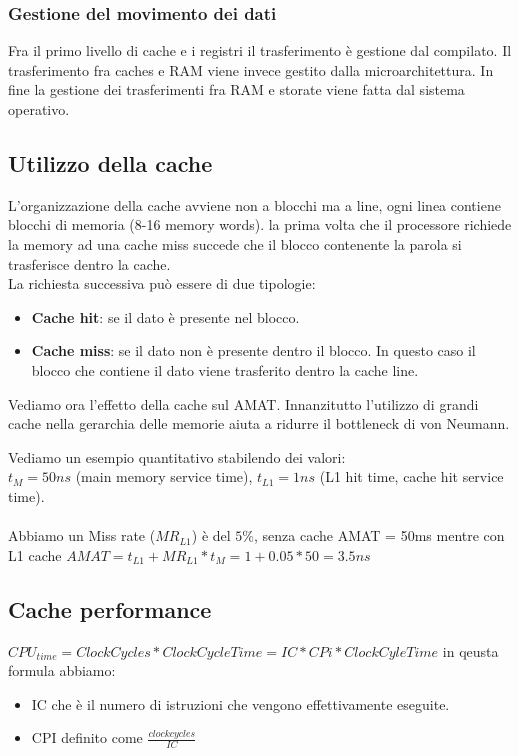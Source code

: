 \subsubsection{Gestione del movimento dei dati}
Fra il primo livello di cache e i registri il trasferimento è gestione dal compilato. Il trasferimento fra caches e RAM viene invece gestito dalla microarchitettura. In fine la gestione dei trasferimenti fra RAM e storate viene fatta dal sistema operativo.

\subsection{Utilizzo della cache}
L'organizzazione della cache avviene non a blocchi ma a line, ogni linea contiene blocchi di memoria (8-16 memory words). la prima volta che il processore richiede la memory ad una cache miss succede che il blocco contenente la parola si trasferisce dentro la cache. \\
La richiesta successiva può essere di due tipologie:
\begin{itemize}
    \item \textbf{Cache hit}: se il dato è presente nel blocco.
    \item \textbf{Cache miss}: se il dato non è presente dentro il blocco. In questo caso il blocco che contiene il dato viene trasferito dentro la cache line.
\end{itemize}

Vediamo ora l'effetto della cache sul AMAT. Innanzitutto l'utilizzo di grandi cache nella gerarchia delle memorie aiuta a ridurre il bottleneck di von Neumann. 
\begin{example}
Vediamo un esempio quantitativo stabilendo dei valori:\\
$t_M = 50ns$ (main memory service time), $t_{L1} = 1ns$ (L1 hit time, cache hit service time). \\\\
Abbiamo un Miss rate ($MR_{L1}$) è del $5\%$, senza cache AMAT = 50ms mentre con L1 cache $AMAT = t_{L1} + MR_{L1} * t_M = 1 + 0.05 * 50 = 3.5ns$
\end{example}

\subsection{Cache performance}
\(CPU_{time} = ClockCycles * ClockCycleTime = IC * CPi * ClockCyleTime\) in qeusta formula abbiamo:
\begin{itemize}
    \item IC che è il numero di istruzioni che vengono effettivamente eseguite.
    \item CPI definito come \(\frac{clockcycles}{IC}\)
\end{itemize}

